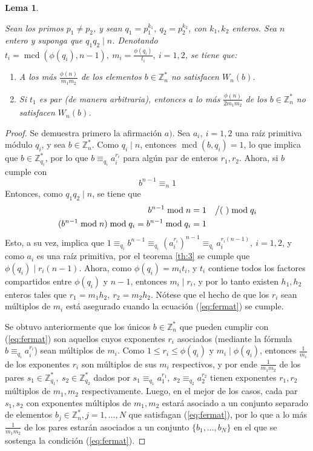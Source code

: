 \documentclass[hidelinks, 12pt]{article}
\newcommand{\Zs}{\mathbb{Z}^*}
\DeclareMathOperator{\mcd}{mcd}
\newtheorem{lemma}{Lema}[section]
\begin{document}
\begin{lemma}
\label{le:4.2}
    Sean los primos $p_1\neq p_2$, y sean $q_1=p_1^{k_1},~q_2=p_2^{k_2}$, con $k_1,k_2$ enteros. Sea $n$ entero y suponga que $q_1q_2\mid n$. Denotando $t_i=\mcd(\phi(q_i),n-1),~m_i=\frac{\phi(q_i)}{t_i},~i=1,2$, se tiene que:
    \begin{enumerate}[label=\alph*\textup{)}]
        \item A los más $\frac{\phi(n)}{m_1m_2}$ de los elementos $b\in\Zs_n$ no satisfacen $W_n(b)$.
        \item Si $t_1$ es par (de manera arbitraria), entonces a lo más $\frac{\phi(n)}{2m_1m_2}$ de los $b\in\Zs_n$ no satisfacen $W_n(b)$.
    \end{enumerate}
\end{lemma}
\begin{proof}
    Se demuestra primero la afirmación $a)$. Sea $a_i,~i=1,2$ una raíz primitiva módulo $q_i$, y sea $b\in\Zs_n$. Como $q_i\mid n$, entonces $\mcd(b,q_i)=1$, lo que implica que $b\in\Zs_{q_i}$, por lo que $b\equiv_{q_i}a_i^{r_i}$ para algún par de enteros $r_1,r_2$. Ahora, si $b$ cumple con
    \begin{equation}
        b^{n-1}\equiv_n 1
        \label{eq:fermat}
    \end{equation}
    Entonces, como $q_1q_2\mid n$, se tiene que
    \begin{align*}
        b^{n-1}\bmod n&=1&&\big{/}(~)\bmod q_i \\
        (b^{n-1}\bmod n)\bmod q_i=b^{n-1}\bmod q_i&=1
    \end{align*}
    Esto, a su vez, implica que $1\equiv_{q_i}b^{n-1}\equiv_{q_i}(a_i^{r_i})^{n-1}\equiv_{q_i}a_i^{r_i(n-1)},~i=1,2$, y como $a_i$ es una raíz primitiva, por el teorema \ref{th:3} se cumple que $\phi(q_i)\mid r_i(n-1)$. Ahora, como $\phi(q_i)=m_it_i$, y $t_i$ contiene todos los factores compartidos entre $\phi(q_i)$ y $n-1$, entonces $m_i\mid r_i$, y por lo tanto existen $h_1,h_2$ enteros tales que $r_1=m_1h_2,~r_2=m_2h_2$. Nótese que el hecho de que los $r_i$ sean múltiplos de $m_i$ está asegurado cuando la ecuación (\ref{eq:fermat}) se cumple.

    Se obtuvo anteriormente que los únicos $b\in\Zs_n$ que pueden cumplir con (\ref{eq:fermat}) son aquellos cuyos exponentes $r_i$ asociados (mediante la fórmula $b\equiv_{q_i}a_i^{r_i}$) sean múltiplos de $m_i$. Como $1\leq r_i\leq\phi(q_i)$ y $m_i\mid\phi(q_i)$, entonces $\frac{1}{m_i}$ de los exponentes $r_i$ son múltiplos de sus $m_i$ respectivos, y por ende $\frac{1}{m_1m_2}$ de los pares $s_1\in\Zs_{q_1},~s_2\in\Zs_{q_2}$ dados por $s_1\equiv_{q_1}a_1^{r_1},~s_2\equiv_{q_2}a_2^{r_2}$ tienen exponentes $r_1,r_2$ múltiplos de $m_1,m_2$ respectivamente. Luego, en el mejor de los casos, cada par $s_1,s_2$ con exponentes múltiplos de $m_1,m_2$ estará asociado a un conjunto separado de elementos $b_j\in\Zs_n,j=1,\dots,N$ que satisfagan (\ref{eq:fermat}), por lo que a lo más $\frac{1}{m_1m_2}$ de los pares estarán asociados a un conjunto $\{b_1,\dots,b_N\}$ en el que se sostenga la condición (\ref{eq:fermat}).


\end{proof}
\end{document}

